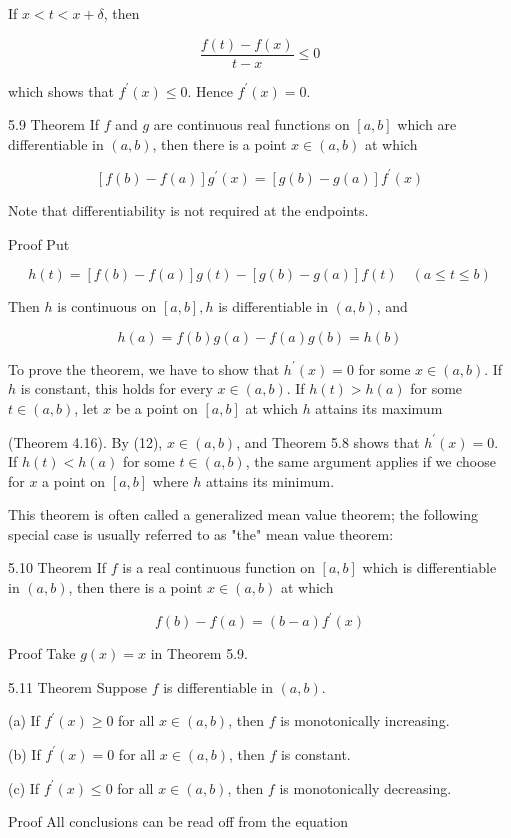 \documentclass[10pt]{article}
\begin{document}
If $x<t<x+\delta$, then

$$
\frac{f(t)-f(x)}{t-x} \leq 0
$$

which shows that $f^{\prime}(x) \leq 0$. Hence $f^{\prime}(x)=0$.

5.9 Theorem If $f$ and $g$ are continuous real functions on $[a, b]$ which are differentiable in $(a, b)$, then there is a point $x \in(a, b)$ at which

$$
[f(b)-f(a)] g^{\prime}(x)=[g(b)-g(a)] f^{\prime}(x)
$$

Note that differentiability is not required at the endpoints.

Proof Put

$$
h(t)=[f(b)-f(a)] g(t)-[g(b)-g(a)] f(t) \quad(a \leq t \leq b)
$$

Then $h$ is continuous on $[a, b], h$ is differentiable in $(a, b)$, and

$$
h(a)=f(b) g(a)-f(a) g(b)=h(b)
$$

To prove the theorem, we have to show that $h^{\prime}(x)=0$ for some $x \in(a, b)$. If $h$ is constant, this holds for every $x \in(a, b)$. If $h(t)>h(a)$ for some $t \in(a, b)$, let $x$ be a point on $[a, b]$ at which $h$ attains its maximum

(Theorem 4.16). By (12), $x \in(a, b)$, and Theorem 5.8 shows that $h^{\prime}(x)=0$. If $h(t)<h(a)$ for some $t \in(a, b)$, the same argument applies if we choose for $x$ a point on $[a, b]$ where $h$ attains its minimum.

This theorem is often called a generalized mean value theorem; the following special case is usually referred to as "the" mean value theorem:

5.10 Theorem If $f$ is a real continuous function on $[a, b]$ which is differentiable in $(a, b)$, then there is a point $x \in(a, b)$ at which

$$
f(b)-f(a)=(b-a) f^{\prime}(x)
$$

Proof Take $g(x)=x$ in Theorem 5.9.

5.11 Theorem Suppose $f$ is differentiable in $(a, b)$.

(a) If $f^{\prime}(x) \geq 0$ for all $x \in(a, b)$, then $f$ is monotonically increasing.

(b) If $f^{\prime}(x)=0$ for all $x \in(a, b)$, then $f$ is constant.

(c) If $f^{\prime}(x) \leq 0$ for all $x \in(a, b)$, then $f$ is monotonically decreasing.

Proof All conclusions can be read off from the equation
\end{document}
